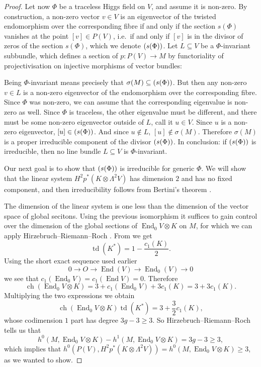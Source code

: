 \documentclass[A4paper, 12pt, british, reqno]{amsart}
\DeclareMathOperator{\End}{End}
\let\div\relax
\DeclareMathOperator{\div}{div}
\newcommand{\ot}{\otimes}
\newcommand{\dual}{^{*}}
\begin{document}
\begin{prop}
\begin{proof}
	Let now $\Phi$ be a traceless Higgs field on $V$, and assume it is non-zero.
	By construction, a non-zero vector $v\in V$ is an eigenvector of the twisted endomorphism over the corresponding fibre if and only if the section $s(\Phi)$ vanishes at the point $[v]\in P(V)$, i.e.~if and only if $[v]$ is in the divisor of zeros of the section $s(\Phi)$, which we denote $\div(s(\Phi))$.
	Let $L\subseteq V$ be a $\Phi$-invariant subbundle, which defines a section of $p\colon P(V)\to M$ by functoriality of projectivisation on injective morphisms of vector bundles:
	\begin{center}
	\end{center}
	Being $\Phi$-invariant means precisely that $\sigma(M)\subseteq \div(s(\Phi))$.
	But then any non-zero $v\in L$ is a non-zero eigenvector of the endomorphism over the corresponding fibre.
	Since $\Phi$ was non-zero, we can assume that the corresponding eigenvalue is non-zero as well.
	Since $\Phi$ is traceless, the other eigenvalue must be different, and there must be some non-zero eigenvector outside of $L$, call it $u\in V$.
	Since $u$ is a non-zero eigenvector, $[u]\in \div(s(\Phi))$.
	And since $u\not\in L$, $[u]\not\in \sigma(M)$.
	Therefore $\sigma(M)$ is a proper irreducible component of the divisor $\div(s(\Phi))$.
	In conclusion: if $\div(s(\Phi))$ is irreducible, then no line bundle $L\subseteq V$ is $\Phi$-invariant.

	Our next goal is to show that $\div(s(\Phi))$ is irreducible for generic $\Phi$.
	We will show that the linear system $H^{2}p^{*}(K\ot\Lambda^{2}V)$ has dimension $2$ and has no fixed component, and then irreducibility follows from Bertini's theorem \cite[Theorem 3.3.1]{laz04a}.

	The dimension of the linear system is one less than the dimension of the vector space of global secitons.
	Using the previous isomorphism it suffices to gain control over the dimension of the global sections of $\End_{0}{V}\ot K$ on $M$, for which we can apply Hirzebruch--Riemann--Roch \cite[Theorem A.4.1]{har77}.
	From \cite[Example A.4.1.1]{har77} we get
	\[ \operatorname{td}(K\dual)=1-\frac{c_{1}(K)}{2}. \]
	Using the short exact sequence used earlier
	\[ 0\to O\to \End(V) \to \End_{0}(V)\to 0 \]
	we see that $c_{1}(\End_{0}{V})=c_{1}(\End{V})=0$.
	Therefore
	\[ \operatorname{ch}(\End_{0}{V}\ot K)=3+c_{1}(\End_{0}{V})+3c_{1}(K)=3+3c_{1}(K). \]
	Multiplying the two expressions we obtain
	\[ \operatorname{ch}(\End_{0}{V}\ot K)\operatorname{td}(K\dual)=3+\frac{3}{2}c_{1}(K), \]
	whose codimension $1$ part has degree $3g-3\geqslant 3$.
	So Hirzebruch--Riemann--Roch tells us that
	\[ h^{0}(M,\End_{0}{V}\ot K)-h^{1}(M,\End_{0}{V}\ot K)=3g-3\geqslant 3, \]
	which implies that $h^{0}(P(V),H^{2}p^{*}(K\ot \Lambda^{2}V))=h^{0}(M,\End_{0}{V}\ot K)\geqslant 3$, as we wanted to show.
    \end{proof}
\end{prop}



\vspace{0.3cm}
\end{document}
